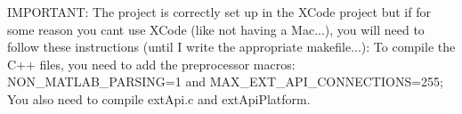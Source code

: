 I\+M\+P\+O\+R\+T\+A\+NT\+: The project is correctly set up in the X\+Code project but if for some reason you can\textquotesingle{}t use X\+Code (like not having a Mac...), you will need to follow these instructions (until I write the appropriate makefile...)\+: To compile the C++ files, you need to add the preprocessor macros\+: N\+O\+N\+\_\+\+M\+A\+T\+L\+A\+B\+\_\+\+P\+A\+R\+S\+I\+NG=1 and M\+A\+X\+\_\+\+E\+X\+T\+\_\+\+A\+P\+I\+\_\+\+C\+O\+N\+N\+E\+C\+T\+I\+O\+NS=255; You also need to compile ext\+Api.\+c and ext\+Api\+Platform. 
